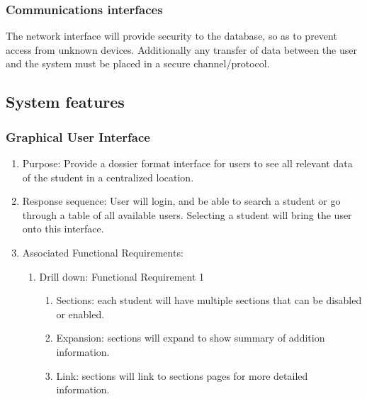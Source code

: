 \documentclass{journal}
\begin{document}
\subsubsection{Communications interfaces}
\begin{description}[style=multiline,leftmargin=3cm,font=\normalfont] 
\item[Network]
The network interface will provide security to the database, so as to prevent access from unknown devices. Additionally any transfer of data between the user and the system must be placed in a secure channel/protocol.  
\subsection{System features}
\subsubsection{Graphical User Interface}
\begin{enumerate}
\item Purpose: Provide a dossier format interface for users to see all relevant data of the student in a centralized location.
\item Response sequence: User will login, and be able to search a student or go through a table of all available users. Selecting a student will bring the user onto this interface.
\item Associated Functional Requirements:
\begin{enumerate}
\item Drill down: Functional Requirement 1
\begin{enumerate}
\item Sections: each student will have multiple sections that can be disabled or enabled.
\item Expansion: sections will expand to show summary of addition information.
\item Link: sections will link to sections pages for more detailed information.
\end{enumerate}
\end{enumerate}
\end{enumerate}

\end{description}
\end{document}
